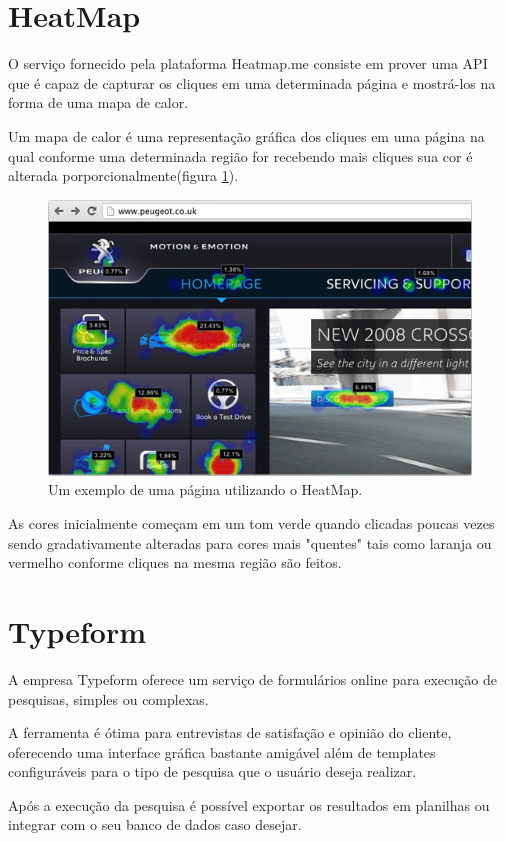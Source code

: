\section{HeatMap}
\par O serviço fornecido pela plataforma Heatmap.me consiste em prover uma API que é capaz de capturar os cliques em uma determinada página e mostrá-los na forma de uma mapa de calor.
\par Um mapa de calor é uma representação gráfica dos cliques em uma página na qual conforme uma determinada região for recebendo mais cliques sua cor é alterada porporcionalmente(figura \ref{fig:heatmap_explanation}).
\begin{figure}[htb]
\centering
\includegraphics[width=15cm]{figuras/heatmap_explanation}
\caption{\label{fig:heatmap_explanation} Um exemplo de uma página utilizando o HeatMap.}
\end{figure}
\par As cores inicialmente começam em um tom verde quando clicadas poucas vezes sendo gradativamente alteradas para cores mais "quentes" tais como laranja ou vermelho conforme cliques na mesma região são feitos.

\section{Typeform}
\par A empresa Typeform oferece um serviço de formulários online para execução de pesquisas, simples ou complexas.
\par A ferramenta é ótima para entrevistas de satisfação e opinião do cliente, oferecendo uma interface gráfica bastante amigável além de templates configuráveis para o tipo de pesquisa que o usuário deseja realizar.
\par Após a execução da pesquisa é possível exportar os resultados em planilhas ou integrar com o seu banco de dados caso desejar.